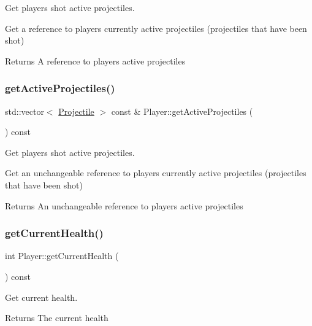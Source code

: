 Get player\textquotesingle{}s shot active projectiles. 

Get a reference to player\textquotesingle{}s currently active projectiles (projectiles that have been shot) \begin{DoxyReturn}{Returns}
A reference to player\textquotesingle{}s active projectiles 
\end{DoxyReturn}
\mbox{\label{classPlayer_a7593094855014964596dd9d8e6347ae6}} 
\subsubsection{\texorpdfstring{get\+Active\+Projectiles()}{getActiveProjectiles()}\hspace{0.1cm}{\footnotesize\ttfamily [2/2]}}
{\footnotesize\ttfamily std\+::vector$<$ \hyperlink{classProjectile}{Projectile} $>$ const  \& Player\+::get\+Active\+Projectiles (\begin{DoxyParamCaption}{ }\end{DoxyParamCaption}) const}



Get player\textquotesingle{}s shot active projectiles. 

Get an unchangeable reference to player\textquotesingle{}s currently active projectiles (projectiles that have been shot) \begin{DoxyReturn}{Returns}
An unchangeable reference to player\textquotesingle{}s active projectiles 
\end{DoxyReturn}
\mbox{\label{classPlayer_ad527d6ed6e22851b0e58455ad1d602da}} 
\subsubsection{\texorpdfstring{get\+Current\+Health()}{getCurrentHealth()}}
{\footnotesize\ttfamily int Player\+::get\+Current\+Health (\begin{DoxyParamCaption}{ }\end{DoxyParamCaption}) const}



Get current health. 

\begin{DoxyReturn}{Returns}
The current health 
\end{DoxyReturn}
\mbox{\label{classPlayer_a367fed9b576ce0058c6f419f91ec3c7d}} 
